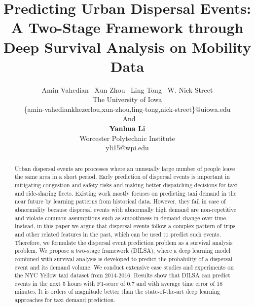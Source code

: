 \documentclass[letterpaper]{article} %
\begin{document}
%
\title{Predicting Urban Dispersal Events: A Two-Stage Framework through Deep Survival Analysis on Mobility Data}
\author{Amin Vahedian \ Xun Zhou \ Ling Tong \ W. Nick Street\\ 
The University of Iowa\\
\{amin-vahediankhezerlou,xun-zhou,ling-tong,nick-street\}@uiowa.edu\\
\ And\\
\textbf{Yanhua Li}\\
Worcester Polytechnic Institute\\
yli15@wpi.edu
}
\maketitle
\begin{abstract}
Urban dispersal events are processes where an unusually large number of people leave the same area in a short period. Early prediction of dispersal events is important in mitigating congestion and safety risks and making better dispatching decisions for taxi and ride-sharing fleets. %
Existing work mostly focuses on predicting taxi demand in the near future by learning patterns from historical data. However, they fail in case of abnormality because dispersal events with abnormally high demand are non-repetitive and violate common assumptions such as smoothness in demand change over time.
%
Instead, in this paper we argue that dispersal events follow a complex pattern of trips and other related features in the past, which can be used to predict such events. Therefore, we formulate the dispersal event prediction problem as a survival analysis problem. We propose a two-stage framework (DILSA), where a deep learning model combined with survival analysis is developed to predict the probability of a dispersal event and its demand volume. We conduct extensive case studies and experiments on the NYC Yellow taxi dataset from 2014-2016. Results show that DILSA can predict events in the next 5 hours with F1-score of $0.7$ and with average time error of $18$ minutes. It is orders of magnitude better than the state-of-the-art deep learning approaches for taxi demand prediction. 
\end{abstract}
\end{document}
